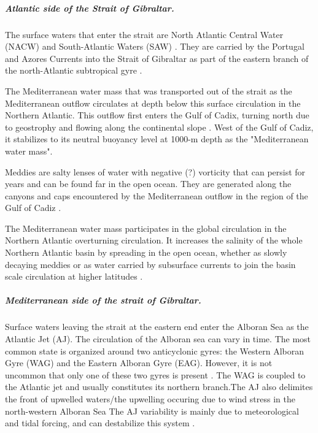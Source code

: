 \subparagraph{Atlantic side of the Strait of Gibraltar.}

The surface waters that enter the strait are North Atlantic Central Water (NACW) and South-Atlantic Waters (SAW) \citep{millot_2014,naranjo_2015}. They are carried by the Portugal and Azores Currents into the Strait of Gibraltar as part of the eastern branch of the north-Atlantic subtropical gyre \citep{barton_2001}.

The Mediterranean water mass that was transported out of the strait as the Mediterranean outflow circulates at depth below this surface circulation in the Northern Atlantic. This outflow first enters the Gulf of Cadix, turning north due to geostrophy and flowing along the continental slope \citep{price_1993,gasser_2017}. West of the Gulf of Cadiz, it stabilizes to its neutral buoyancy level at 1000-m depth as the "Mediterranean water mass"\citep{price_1993}.

Meddies are salty lenses of water with negative  \color{blue}(?) \color{black} vorticity that can persist for years and can be found far in the open ocean. \color{blue}They \color{black} are generated along the canyons and caps encountered by the Mediterranean outflow in the region of the Gulf of Cadiz \citep{bashmachnikov_2015}. 

The Mediterranean water mass participates in the global circulation in the Northern Atlantic overturning circulation. It increases the salinity of the whole Northern Atlantic basin by spreading in the open ocean, whether as slowly decaying meddies or as water carried by subsurface currents to join the basin scale circulation at higher latitudes \citep{price_1993,jia_2007}.

\subparagraph{Mediterranean side of the strait of Gibraltar.} 

Surface waters leaving the strait at the eastern end enter the Alboran Sea as the Atlantic Jet (AJ). The circulation of the Alboran sea can vary in time. The most common state is organized around two anticyclonic gyres: the Western Alboran Gyre (WAG) and the Eastern Alboran Gyre (EAG). However, it is not uncommon that only one of these two gyres is present \citep{millot_2005}. The WAG is coupled to the Atlantic jet and usually constitutes its northern branch.\color{red}The AJ also delimites the front of upwelled waters/the upwelling occuring due to wind stress in the north-western Alboran Sea \citep{sarhan_2000}\color{black} The AJ variability is mainly due to meteorological and tidal forcing, and can destabilize this system \citep{sanchez-garrido_2013,lorente_2019}.

